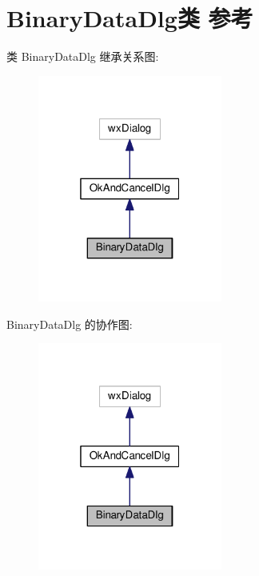 \hypertarget{class_binary_data_dlg}{\section{Binary\+Data\+Dlg类 参考}
\label{class_binary_data_dlg}
}


类 Binary\+Data\+Dlg 继承关系图\+:
\nopagebreak
\begin{figure}[H]
\begin{center}
\leavevmode
\includegraphics[width=172pt]{class_binary_data_dlg__inherit__graph}
\end{center}
\end{figure}


Binary\+Data\+Dlg 的协作图\+:
\nopagebreak
\begin{figure}[H]
\begin{center}
\leavevmode
\includegraphics[width=172pt]{class_binary_data_dlg__coll__graph}
\end{center}
\end{figure}
